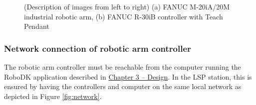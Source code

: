 \begin{figure}[H]
\begin{center}
  \hspace{1cm}
  \caption[Časové odezvy virtuálního modelu vodní nádrže]
    {(Description of images from left to right) (a) FANUC M-20iA/20M industrial robotic arm, (b) FANUC R-30iB controller with Teach Pendant \cite{fanucrobotcontroller}}
  \label{fig:lsplayout}
\end{center}
\end{figure}


\subsubsection*{Network connection of robotic arm controller}


The robotic arm controller must be reachable from the computer running the RoboDK application described in \hyperref[chap:design]{Chapter 3 -- Design}. In the LSP station, this is ensured by having the controllers and computer on the same local network as depicted in Figure \ref{fig:network}. 

